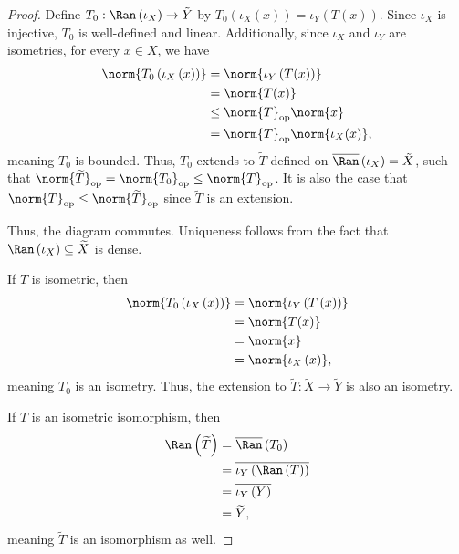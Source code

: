 \documentclass[10pt]{mypackage}
\begin{document}
\begin{proof}
  Define $T_0: \Ran\left(\iota_X\right)\rightarrow \tilde{Y}$ by $T_0\left(\iota_X\left(x\right)\right) = \iota_Y\left(T(x)\right)$. Since $\iota_X$ is injective, $T_0$ is well-defined and linear. Additionally, since $\iota_X$ and $\iota_Y$ are isometries, for every $x\in X$, we have
  \begin{align*}
    \norm{T_0\left(\iota_X\left(x\right)\right)} &= \norm{\iota_Y\left(T(x)\right)}\\
                                                 &= \norm{T(x)}\\
                                                 &\leq \norm{T}_{\text{op}}\norm{x}\\
                                                 &= \norm{T}_{\text{op}}\norm{\iota_X(x)},
  \end{align*}
  meaning $T_0$ is bounded. Thus, $T_0$ extends to $\widetilde{T}$ defined on $\overline{\Ran}\left(\iota_X\right) = \tilde{X}$, such that $\norm{\widetilde{T}}_{\text{op}} = \norm{T_0}_{\text{op}} \leq \norm{T}_{\text{op}}$. It is also the case that $\norm{T}_{\text{op}}\leq \norm{\widetilde{T}}_{\text{op}}$ since $\widetilde{T}$ is an extension.\newline

  Thus, the diagram commutes. Uniqueness follows from the fact that $\Ran\left(\iota_X\right)\subseteq \widetilde{X}$ is dense.\newline

  If $T$ is isometric, then
  \begin{align*}
    \norm{T_0\left(\iota_X\left(x\right)\right)} &= \norm{\iota_Y\left(T\left(x\right)\right)}\\
                                                 &= \norm{T(x)}\\
                                                 &= \norm{x}\\
                                                 &= \norm{\iota_X\left(x\right)},
  \end{align*}
  meaning $T_0$ is an isometry. Thus, the extension to $\widetilde{T}: \widetilde{X}\rightarrow \widetilde{Y}$ is also an isometry.\newline

  If $T$ is an isometric isomorphism, then
  \begin{align*}
    \Ran\left(\widetilde{T}\right) &= \overline{\Ran}\left(T_0\right)\\
                                   &= \overline{\iota_Y\left(\Ran\left(T\right)\right)}\\
                                   &= \overline{\iota_Y\left(Y\right)}\\
                                   &= \widetilde{Y},
  \end{align*}
  meaning $\widetilde{T}$ is an isomorphism as well.
\end{proof}
\end{document}
